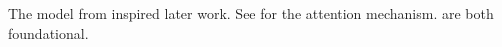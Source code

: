 \documentclass{article}
\begin{document}
The model from \citet{lecun1989b} inspired later work.
See \citep{vaswani2017preprint} for the attention mechanism.
\citep{lecun1989,lecun1989b} are both foundational.





\end{document}
